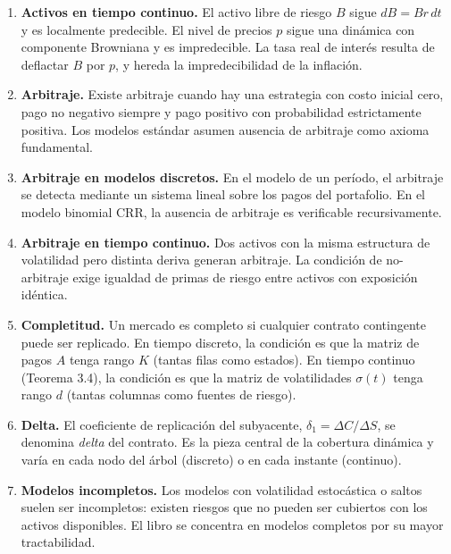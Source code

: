 \documentclass[12pt]{article}
\begin{document}
\begin{enumerate}
  \item \textbf{Activos en tiempo continuo.} El activo libre de riesgo $B$ sigue $dB = Br\,dt$ y es localmente predecible. El nivel de precios $p$ sigue una din\'amica con componente Browniana y es impredecible. La tasa real de inter\'es resulta de deflactar $B$ por $p$, y hereda la impredecibilidad de la inflaci\'on.

  \item \textbf{Arbitraje.} Existe arbitraje cuando hay una estrategia con costo inicial cero, pago no negativo siempre y pago positivo con probabilidad estrictamente positiva. Los modelos est\'andar asumen ausencia de arbitraje como axioma fundamental.

  \item \textbf{Arbitraje en modelos discretos.} En el modelo de un per\'iodo, el arbitraje se detecta mediante un sistema lineal sobre los pagos del portafolio. En el modelo binomial CRR, la ausencia de arbitraje es verificable recursivamente.

  \item \textbf{Arbitraje en tiempo continuo.} Dos activos con la misma estructura de volatilidad pero distinta deriva generan arbitraje. La condici\'on de no-arbitraje exige igualdad de primas de riesgo entre activos con exposici\'on id\'entica.

  \item \textbf{Completitud.} Un mercado es completo si cualquier contrato contingente puede ser replicado. En tiempo discreto, la condici\'on es que la matriz de pagos $A$ tenga rango $K$ (tantas filas como estados). En tiempo continuo (Teorema 3.4), la condici\'on es que la matriz de volatilidades $\sigma(t)$ tenga rango $d$ (tantas columnas como fuentes de riesgo).

  \item \textbf{Delta.} El coeficiente de replicaci\'on del subyacente, $\delta_1 = \Delta C / \Delta S$, se denomina \textit{delta} del contrato. Es la pieza central de la cobertura din\'amica y var\'ia en cada nodo del \'arbol (discreto) o en cada instante (continuo).

  \item \textbf{Modelos incompletos.} Los modelos con volatilidad estoc\'astica o saltos suelen ser incompletos: existen riesgos que no pueden ser cubiertos con los activos disponibles. El libro se concentra en modelos completos por su mayor tractabilidad.
\end{enumerate}
\end{document}
